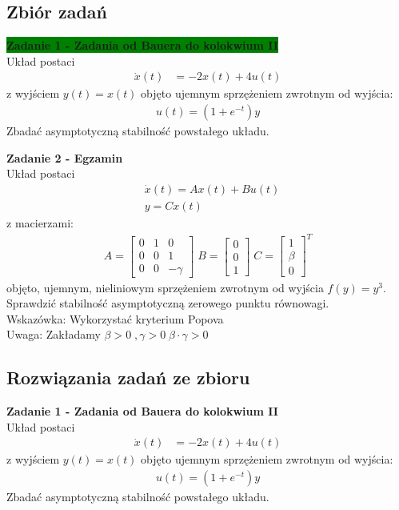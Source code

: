 \documentclass[a4paper,11pt]{article}
\begin{document}
\subsection{Zbiór zadań}
\begin{framed}
\textbf{\colorbox{green}{Zadanie 1 - Zadania od Bauera do kolokwium II }} \\ 
Układ postaci
\begin{align*}
\dot{x}(t)&=-2x(t)+4u(t)
\end{align*}
z wyjściem \( y(t)=x(t) \) objęto ujemnym sprzężeniem zwrotnym od wyjścia:
\begin{align*}
u(t)=(1+e^{-t})y
\end{align*}
Zbadać asymptotyczną stabilność powstałego układu. 
\end{framed}

\begin{framed}
\textbf{Zadanie 2 - Egzamin } \\ 
Układ postaci
\begin{align*}
&\dot{x}(t)=Ax(t)+Bu(t) \\
&y=Cx(t)
\end{align*}
z macierzami:
\begin{align*}
A = 
\begin{bmatrix}
0 & 1 & 0 \\
0 & 0 & 1 \\
0 & 0 & -\gamma 
\end{bmatrix} 
\;
B = 
\begin{bmatrix}
0 \\
0 \\
1
\end{bmatrix}
\;
C = 
\begin{bmatrix}
1 \\
\beta \\
0
\end{bmatrix}^{T}
\end{align*}
objęto, ujemnym, nieliniowym sprzężeniem zwrotnym od wyjścia \( f(y) = y^3 \). Sprawdzić stabilność asymptotyczną zerowego punktu równowagi. \\
Wskazówka: Wykorzystać kryterium Popova \\
Uwaga: Zakładamy \( \beta > 0 \; , \gamma > 0 \; \beta \cdot \gamma > 0 \)
\end{framed}



\newpage
\subsection{Rozwiązania zadań ze zbioru}
\begin{framed}
\textbf{Zadanie 1 - Zadania od Bauera do kolokwium II } \\ 
Układ postaci
\begin{align*}
\dot{x}(t)&=-2x(t)+4u(t)
\end{align*}
z wyjściem \( y(t)=x(t) \) objęto ujemnym sprzężeniem zwrotnym od wyjścia:
\begin{align*}
u(t)=(1+e^{-t})y
\end{align*}
Zbadać asymptotyczną stabilność powstałego układu. 
\end{framed}
\end{document}
